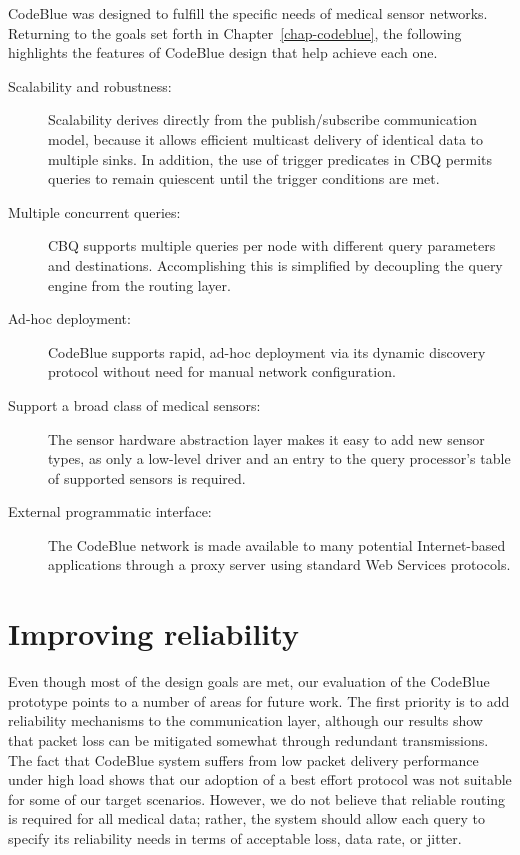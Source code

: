 CodeBlue was designed to fulfill the specific needs of medical sensor
networks. Returning to the goals set forth in Chapter~\ref{chap-codeblue}, the
following highlights the features of CodeBlue design that help achieve each one.

\begin{description}
\item[Scalability and robustness:] Scalability derives directly
from the publish/subscribe communication model, because it allows
efficient multicast delivery of identical data to multiple sinks.
In addition, the use of trigger predicates in CBQ permits queries
to remain quiescent until the trigger conditions are met. 

\item[Multiple concurrent queries:] CBQ supports multiple queries per
node with different query parameters and
destinations. Accomplishing this is simplified by decoupling the query
engine from the routing layer.

\item[Ad-hoc deployment:] CodeBlue supports rapid, ad-hoc deployment 
via its dynamic discovery protocol without need for manual network
configuration.

\item[Support a broad class of medical sensors:] The sensor hardware
abstraction layer makes it easy to add new sensor types, as only a
low-level driver and an entry to the query processor's table of
supported sensors is required.

\item[External programmatic interface:] The CodeBlue network is made
available to many potential Internet-based applications through a
proxy server using standard Web Services protocols.
\end{description}

\section{Improving reliability}

Even though most of the design goals are met, our evaluation of the CodeBlue
prototype points to a number of areas for future work. The first priority is
to add reliability mechanisms to the communication layer, although our results
show that packet loss can be mitigated somewhat through redundant
transmissions. The fact that CodeBlue system suffers from low packet delivery
performance under high load shows that our adoption of a best effort protocol
was not suitable for some of our target scenarios. However, we do not believe
that reliable routing is required for all medical data; rather, the system
should allow each query to specify its reliability needs in terms of
acceptable loss, data rate, or jitter.


